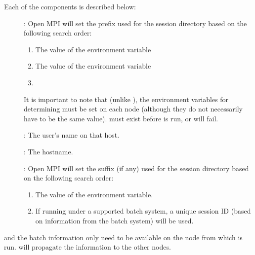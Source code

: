 \centerline{}

\noindent Each of the components is described below:

\begin{description}
\item[]: Open MPI will set the prefix used for the session
  directory based on the following search order:

  \begin{enumerate}
    \item The value of the 
      environment variable

    \item The value of the  environment variable

    \item {}
  \end{enumerate}
  
  It is important to note that (unlike
  ), the environment
  variables for determining  must be set on each node
  (although they do not necessarily have to be the same value).
   must exist before  is run, or
   will fail.

\item[]: The user's name on that host.

\item[]: The hostname.
  
\item[]: Open MPI will set the suffix (if any) used
  for the session directory based on the following search order:

  \begin{enumerate}

    \item The value of the 
      environment variable.
  
    \item If running under a supported batch system, a unique session
      ID (based on information from the batch system) will be used.
  \end{enumerate}
\end{description}
  
 and the batch information
only need to be available on the node from which  is
run.   will propagate the information to the other
nodes.

